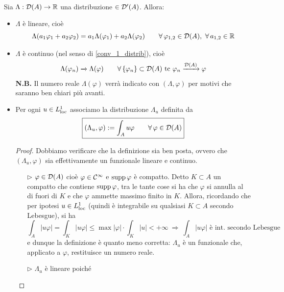 Sia $\Lambda:\mathcal{D}(A)\to\mathbb{R}$ una distribuzione $\in\mathcal{D}'(A)$. Allora:
\begin{itemize}
    \item $\Lambda$ è lineare, cioè
    \begin{equation*}
    \Lambda(a_1\varphi_1+a_2\varphi_2)=a_1\Lambda(\varphi_1)+a_2\Lambda(\varphi_2)\qquad \forall \varphi_{1,2}\in\Dc(A),\ \forall a_{1,2}\in\RR
    \end{equation*}
    \item $\Lambda$ è continuo (nel senso di \eqref{conv_1_distrib}), cioè
    \begin{equation}
    \label{conv_2_distrib}
    \Lambda(\varphi_n)\xrightarrow[]{}\Lambda(\varphi)\qquad \forall \{\varphi_n\}\subset\Dc(A)\text{ tc }\varphi_n\xrightarrow[]{\Dc(A)}\varphi
    \end{equation}
    \textbf{N.B.} Il numero reale $\Lambda(\varphi)$ verrà indicato con $(\Lambda,\varphi)$ per motivi che saranno ben chiari più avanti.
    \item Per ogni $u\in L^1_{\operatorname{loc}}$ associamo la distribuzione $\Lambda_u$ definita da
    \begin{equation*}
    \boxed{(\Lambda_u,\varphi):=\int_A u\varphi \qquad \forall \varphi\in\Dc(A)}
    \end{equation*}
    \begin{proof}
    Dobbiamo verificare che la definizione sia ben posta, ovvero che $(\Lambda_u,\varphi)$ sia effettivamente un funzionale lineare e continuo.
    \begin{itemize}
        \item [$\triangleright$] $\varphi\in\mathcal{D}(A)$ cioè $\varphi\in\mathcal{C}^\infty$ e $\operatorname*{supp}\varphi$ è compatto. Detto $K\subset A$ un compatto che contiene $\operatorname*{supp}\varphi$, tra le tante cose si ha che $\varphi$ si annulla al di fuori di $K$ e che $\varphi$ ammette massimo finito in $K$. Allora, ricordando che per ipotesi $u\in L^1_{\operatorname{loc}}$ (quindi è integrabile su qualsiasi $K\subset A$ secondo Lebesgue), si ha
        \begin{equation*}
        \int_A |u\varphi|=\int_K |u\varphi| \leq \max|\varphi|\cdot\int_K |u|<+\infty\ \Rightarrow\ \int_A |u\varphi|\text{ è int. secondo Lebesgue}
        \end{equation*}
        e dunque la definizione è quanto meno corretta: $\Lambda_u$ è un funzionale che, applicato a $\varphi$, restituisce un numero reale.
        \item [$\triangleright$] $\Lambda_u$ è lineare poiché
        \begin{equation*}

\end{equation*}
\end{itemize}
\end{proof}
\end{itemize}
